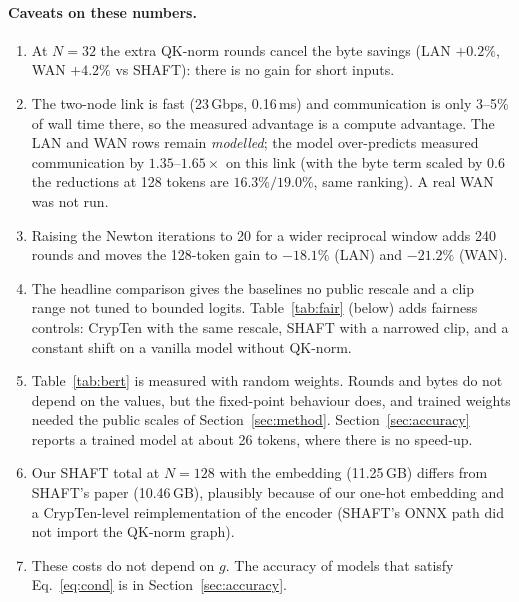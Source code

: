 \documentclass[11pt]{article}
\begin{document}
\paragraph{Caveats on these numbers.}
\begin{enumerate}\setlength{\itemsep}{1pt}
\item At $N{=}32$ the extra QK-norm rounds cancel the byte savings (LAN $+0.2\%$, WAN $+4.2\%$ vs SHAFT): there is no gain
for short inputs.
\item The two-node link is fast (23\,Gbps, 0.16\,ms) and communication is only 3--5\% of wall time there, so the measured
advantage is a compute advantage. The LAN and WAN rows remain \emph{modelled}; the model over-predicts measured
communication by $1.35$--$1.65\times$ on this link (with the byte term scaled by $0.6$ the reductions at 128 tokens are
$16.3\%/19.0\%$, same ranking). A real WAN was not run.
\item Raising the Newton iterations to 20 for a wider reciprocal window adds 240 rounds and moves the 128-token gain to
$-18.1\%$ (LAN) and $-21.2\%$ (WAN).
\item The headline comparison gives the baselines no public rescale and a clip range not tuned to bounded logits.
Table~\ref{tab:fair} (below) adds fairness controls: CrypTen with the same rescale, SHAFT with a narrowed clip, and a constant shift on a vanilla model
without QK-norm.
\item Table~\ref{tab:bert} is measured with random weights. Rounds and bytes do not depend on the values, but the fixed-point
behaviour does, and trained weights needed the public scales of Section~\ref{sec:method}. Section~\ref{sec:accuracy} reports a
trained model at about 26 tokens, where there is no speed-up.
\item Our SHAFT total at $N{=}128$ with the embedding (11.25\,GB) differs from SHAFT's paper (10.46\,GB), plausibly because of
our one-hot embedding and a CrypTen-level reimplementation of the encoder (SHAFT's ONNX path did not import the QK-norm graph).
\item These costs do not depend on $g$. The accuracy of models that satisfy Eq.~\eqref{eq:cond} is in
Section~\ref{sec:accuracy}.
\end{enumerate}
\end{document}
